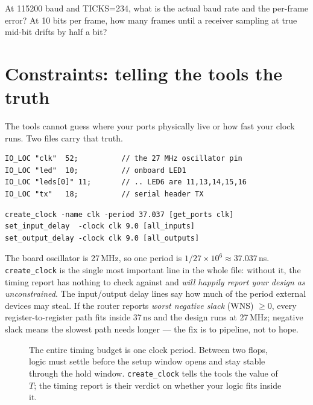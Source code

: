 \begin{exercise}[medium]
At 115200 baud and TICKS=234, what is the actual baud rate and the per-frame
error? At 10 bits per frame, how many frames until a receiver sampling at true
mid-bit drifts by half a bit?
\end{exercise}

\section{Constraints: telling the tools the truth}

The tools cannot guess where your ports physically live or how fast your clock
runs. Two files carry that truth.

\begin{lstlisting}[caption={Physical constraints (\texttt{ch13\_tangnano.cst}) ---
pin numbers from the Sipeed Tang~Nano~9K schematic \cite{tangnano9k}; check
your board revision before trusting them.}]
IO_LOC "clk"  52;          // the 27 MHz oscillator pin
IO_LOC "led"  10;          // onboard LED1
IO_LOC "leds[0]" 11;       // .. LED6 are 11,13,14,15,16
IO_LOC "tx"   18;          // serial header TX
\end{lstlisting}

\begin{lstlisting}[caption={Timing constraints (\texttt{ch13\_timing.sdc}) ---
one clock line, and everything else derives from it.}]
create_clock -name clk -period 37.037 [get_ports clk]
set_input_delay  -clock clk 9.0 [all_inputs]
set_output_delay -clock clk 9.0 [all_outputs]
\end{lstlisting}

\begin{example}[Why 37.037?]
The board oscillator is 27\,MHz, so one period is $1/27\times10^6 \approx
37.037$\,ns. \texttt{create\_clock} is the single most important line in the
whole file: without it, the timing report has nothing to check against and
\emph{will happily report your design as unconstrained}. The input/output
delay lines say how much of the period external devices may steal. If the
router reports \emph{worst negative slack} (WNS) $\geq 0$, every
register-to-register path fits inside 37\,ns and the design runs at 27\,MHz;
negative slack means the slowest path needs longer --- the fix is to pipeline,
not to hope.
\end{example}

\begin{figure}[htbp]\centering

\caption{The entire timing budget is one clock period. Between two flops,
logic must settle before the setup window opens and stay stable through the
hold window. \texttt{create\_clock} tells the tools the value of $T$; the
timing report is their verdict on whether your logic fits inside it.}
\label{fig:timing13}
\end{figure}

